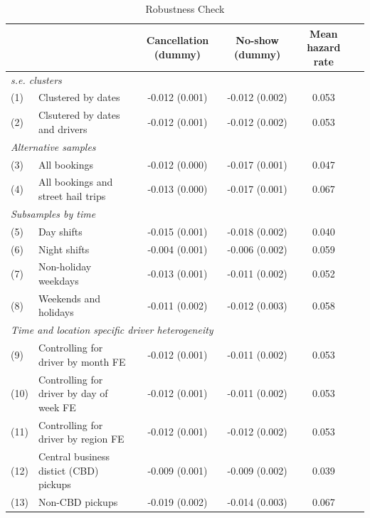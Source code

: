 \documentclass[reviewmode,AEJ]{AEA}
\begin{document}
\begin{table}[]
    \centering
    \footnotesize
    \caption{Robustness Check}
    \def\sym#1{}%
    \begin{tabularx}{\textwidth}{ll@{\extracolsep{\fill}}*{4}{c}}
    	\toprule
    	\toprule
    	&      & Cancellation (dummy) & No-show (dummy) & Mean hazard rate \\
    	\midrule
    	\multicolumn{5}{l}{\textit{s.e. clusters}} \\
    	(1)  & Clustered by dates & -0.012\sym{***} (0.001) & -0.012\sym{***} (0.002) & 0.053 \\
    	(2)  & Clsutered by dates and drivers & -0.012\sym{***} (0.001) & -0.012\sym{***} (0.002) & 0.053 \\
    	\midrule
    	\multicolumn{5}{l}{\textit{Alternative samples}} \\
    	(3)  & All bookings & -0.012\sym{***} (0.000) & -0.017\sym{***} (0.001) & 0.047 \\
    	(4)  & All bookings and street hail trips & -0.013\sym{***} (0.000) & -0.017\sym{***} (0.001) & 0.067 \\
    	\midrule
    	\multicolumn{5}{l}{\textit{Subsamples by time}} \\
    	(5)  & Day shifts & -0.015\sym{***} (0.001) & -0.018\sym{***} (0.002) & 0.040 \\
    	(6)  & Night shifts & -0.004\sym{***} (0.001) & -0.006\sym{***} (0.002) & 0.059 \\
    	(7)  & Non-holiday weekdays & -0.013\sym{***} (0.001) & -0.011\sym{***} (0.002) & 0.052 \\
    	(8)  & Weekends and holidays & -0.011\sym{***} (0.002) & -0.012\sym{***} (0.003) & 0.058 \\
    	\midrule
    	\multicolumn{5}{l}{\textit{Time and location specific driver heterogeneity }} \\
    	(9)  & Controlling for driver by month FE & -0.012\sym{***} (0.001) & -0.011\sym{***} (0.002) & 0.053 \\
    	(10) & Controlling for driver by day of week FE & -0.012\sym{***} (0.001) & -0.011\sym{***} (0.002) & 0.053 \\
    	(11) & Controlling for driver by region FE & -0.012\sym{***} (0.001) & -0.012\sym{***} (0.002) & 0.053 \\
    	(12) & Central business distict (CBD) pickups & -0.009\sym{***} (0.001) & -0.009\sym{***} (0.002) & 0.039 \\
    	(13) & Non-CBD pickups & -0.019\sym{***} (0.002) & -0.014\sym{***} (0.003) & 0.067 \\

\end{tabularx}
\end{table}
\end{document}

